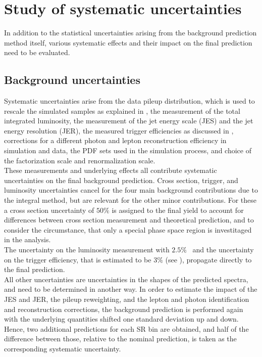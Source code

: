 \section{Study of systematic uncertainties}\label{sec:Syst}
In addition to the statistical uncertainties arising from the background prediction method itself, various systematic effects and their impact on the final prediction need to be evaluated.

\subsection{Background uncertainties}
Systematic uncertainties arise from the data pileup distribution, which is used to rescale the simulated samples as explained in , the measurement of the total integrated luminosity, the measurement of the jet energy scale (JES) and the jet energy resolution (JER), the measured trigger efficiencies as discussed in , corrections for a different photon and lepton reconstruction efficiency in simulation and data, the PDF sets used in the simulation process, and choice of the factorization scale and renormalization scale.\\
These measurements and underlying effects all contribute systematic uncertainties on the final background prediction. Cross section, trigger, and luminosity uncertainties cancel for the four main background contributions due to the integral method, but are relevant for the other minor contributions. For these a cross section uncertainty of $50\%$ is assigned to the final yield to account for  differences between cross section measurement and theoretical prediction, and to consider the circumstance, that only a special phase space region is investitaged in the analysis.\\
The uncertainty on the luminosity measurement with $2.5\%$~\cite{LumiUncert} and the uncertainty on the trigger efficiency, that is estimated to be $3\%$ (see ), propagate directly to the final prediction.\\
All other uncertainties are uncertainties in the shapes of the predicted spectra, and need to be determined in another way. In order to estimate the impact of the JES and JER, the pileup reweighting, and the lepton and photon identification and reconstruction corrections, the background prediction is performed again with the underlying quantities shifted one standard deviation up and down. Hence, two additional predictions for each SR bin are obtained, and half of the difference between those, relative to the nominal prediction, is taken as the corresponding systematic uncertainty.\\
